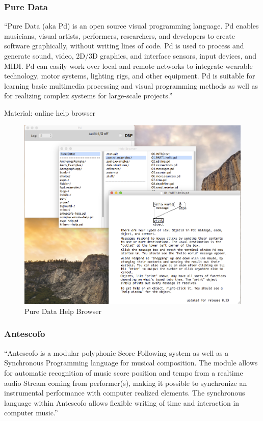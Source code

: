 \documentclass[onecolumn,nocopyrightspace,preprint]{sigplanconf}
\begin{document}
\subsubsection{Pure Data}

``Pure Data (aka Pd) is an open source visual programming language. Pd enables
musicians, visual artists, performers, researchers, and developers to create
software graphically, without writing lines of code. Pd is used to process
and generate sound, video, 2D/3D graphics, and interface sensors, input
devices, and MIDI. Pd can easily work over local and remote networks to
integrate wearable technology, motor systems, lighting rigs, and other
equipment. Pd is suitable for learning basic multimedia processing and
visual programming methods as well as for realizing complex systems for
large-scale projects.''~\cite{website:puredata}

Material: online help browser

\begin{figure}[ht]
    \centering
    \includegraphics[scale=0.4]{fig/pd-help-browser.png}
    \caption{Pure Data Help Browser}
    \label{fig:pd-help-browser}
\end{figure}


\subsubsection{Antescofo}

``Antescofo is a modular polyphonic Score Following system as well as a
Synchronous Programming language for musical composition. The module allows
for automatic recognition of music score position and tempo from a realtime
audio Stream coming from performer(s), making it possible to synchronize an
instrumental performance with computer realized elements. The synchronous
language within Antescofo allows flexible writing of time and interaction in
computer music.''~\cite{website:antescofo}
\end{document}
